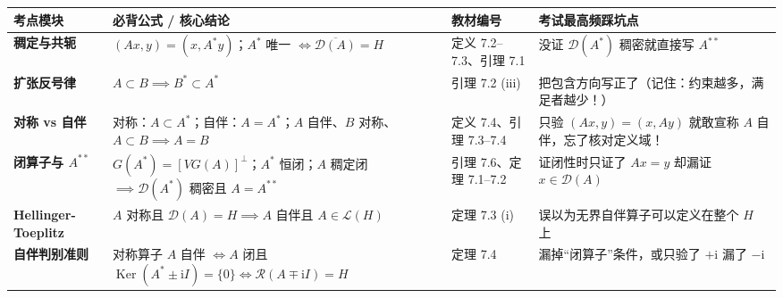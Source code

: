 \documentclass[11pt,a4paper]{article}
\newcounter{none}
\begin{document}
{\def\LTcaptype{none} %
{\small\renewcommand{\arraystretch}{1.38}\setlength{\tabcolsep}{5pt}
\begin{longtable}[]{@{}
  >{\raggedright\arraybackslash}p{}
  >{\raggedright\arraybackslash}p{}
  >{\raggedright\arraybackslash}p{}
  >{\raggedright\arraybackslash}p{}@{}}
\toprule\noalign{}
\rowcolor{AccentSoft}
\begin{minipage}[b]{\linewidth}\raggedright
考点模块
\end{minipage} & \begin{minipage}[b]{\linewidth}\raggedright
必背公式 / 核心结论
\end{minipage} & \begin{minipage}[b]{\linewidth}\raggedright
教材编号
\end{minipage} & \begin{minipage}[b]{\linewidth}\raggedright
考试最高频踩坑点
\end{minipage} \\
\midrule\noalign{}
\endhead
\bottomrule\noalign{}
\endlastfoot
\textbf{稠定与共轭} & \((Ax, y) = (x, A^*y)\)；\(A^*\) 唯一 \(\iff \overline{\mathcal{D}(A)} = H\) & 定义 7.2--7.3、引理 7.1 & 没证 \(\mathcal{D}(A^*)\) 稠密就直接写 \(A^{**}\) \\
\textbf{扩张反号律} & \(A \subset B \implies B^* \subset A^*\) & 引理 7.2 (iii) & 把包含方向写正了（记住：约束越多，满足者越少！） \\
\textbf{对称 vs 自伴} & 对称：\(A \subset A^*\)；自伴：\(A = A^*\)；\(A\) 自伴、\(B\) 对称、\(A \subset B \implies A = B\) & 定义 7.4、引理 7.3--7.4 & 只验 \((Ax,y)=(x,Ay)\) 就敢宣称 \(A\) 自伴，忘了核对定义域！ \\
\textbf{闭算子与 \(A^{**}\)} & \(G(A^*) = [VG(A)]^\perp\)；\(A^*\) 恒闭；\(A\) 稠定闭 \(\implies \mathcal{D}(A^*)\) 稠密且 \(A=A^{**}\) & 引理 7.6、定理 7.1--7.2 & 证闭性时只证了 \(Ax=y\) 却漏证 \(x \in \mathcal{D}(A)\) \\
\textbf{Hellinger-Toeplitz} & \(A\) 对称且 \(\mathcal{D}(A) = H \implies A\) 自伴且 \(A \in \mathcal{L}(H)\) & 定理 7.3 (i) & 误以为无界自伴算子可以定义在整个 \(H\) 上 \\
\textbf{自伴判别准则} & 对称算子 \(A\) 自伴 \(\iff A\) 闭且 \(\operatorname{Ker}(A^*\pm\mathrm{i}I)=\{0\} \iff \mathcal{R}(A\mp\mathrm{i}I)=H\) & 定理 7.4 & 漏掉``闭算子''条件，或只验了 \(+\mathrm{i}\) 漏了 \(-\mathrm{i}\) \\

\end{longtable}}}
\end{document}
